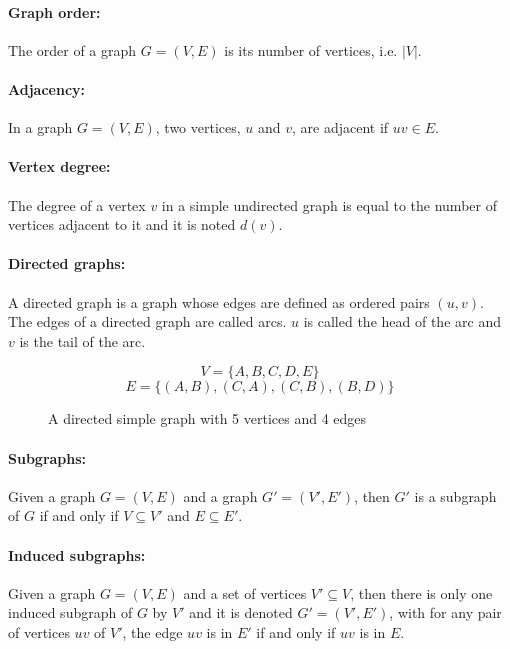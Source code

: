 \paragraph{Graph order:}
The order of a graph $G=(V,E)$ is its number of vertices, i.e. $|V|$.

\paragraph{Adjacency:}
In a graph $G=(V,E)$, two vertices, $u$ and $v$, are adjacent if $uv \in E$.

\paragraph{Vertex degree:}
The degree of a vertex $v$ in a simple undirected graph is equal to the number of
vertices adjacent to it and it is noted $d(v)$.


\paragraph{Directed graphs:} 
A directed graph is a graph whose edges are defined as ordered pairs
$(u,v)$. The edges of a directed graph are called arcs. 
$u$ is called the head of the arc and $v$ is the tail of the arc.
\begin{figure}[!h]
  \caption{A directed simple graph with 5 vertices and 4 edges}
  \begin{center}
    
  \end{center}
  $$V = \{A,B,C,D,E\}$$
  $$E = \Big\{(A,B),(C,A),(C,B),(B,D)\Big\}$$
\end{figure}

\paragraph{Subgraphs:}
Given a graph $G = (V,E)$ and a graph $G' = (V',E')$, then $G'$ is a subgraph of $G$ 
if and only if $V \subseteq V'$ and $E \subseteq E'$.

\paragraph{Induced subgraphs:}
Given a graph $G = (V,E)$ and a set of vertices $V' \subseteq V$, then
there is only one induced subgraph of $G$ by $V'$ and it is denoted
$G' = (V',E')$, with for any pair of vertices $uv$ of $V'$, the edge $uv$ is
in $E'$ if and only if $uv$ is in $E$.


